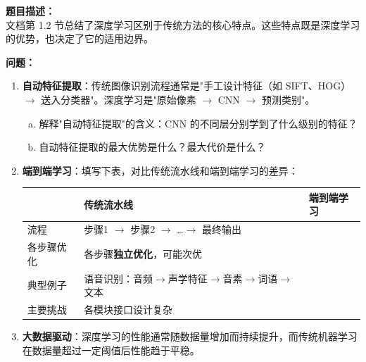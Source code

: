 \documentclass[a4paper,11pt]{ctexart}
\begin{document}
\begin{problembox}
    \textbf{题目描述：}\\
    文档第 1.2 节总结了深度学习区别于传统方法的核心特点。这些特点既是深度学习的优势，也决定了它的适用边界。

    \vspace{0.3cm}
    \textbf{问题：}
    \begin{enumerate}[(1)]
        \item \textbf{自动特征提取}：传统图像识别流程通常是"手工设计特征（如 SIFT、HOG）$\to$ 送入分类器"。深度学习是"原始像素 $\to$ CNN $\to$ 预测类别"。

        \begin{enumerate}[a.]
            \item 解释"自动特征提取"的含义：CNN 的不同层分别学到了什么级别的特征？
            \item 自动特征提取的最大优势是什么？最大代价是什么？
        \end{enumerate}

        \item \textbf{端到端学习}：填写下表，对比传统流水线和端到端学习的差异：

        \begin{center}
        \begin{tabular}{p{3.0cm} p{4.5cm} p{4.0cm}}
            \toprule
            & 传统流水线 & 端到端学习 \\
            \midrule
            流程 & 步骤1 $\to$ 步骤2 $\to$ \ldots $\to$ 最终输出 & \underline{\hspace{3.5cm}} \\[1.5em]
            各步骤优化 & 各步骤\textbf{独立优化}，可能次优 & \underline{\hspace{3.5cm}} \\[1.5em]
            典型例子 & 语音识别：音频$\to$声学特征$\to$音素$\to$词语$\to$文本 & \underline{\hspace{3.5cm}} \\[1.5em]
            主要挑战 & 各模块接口设计复杂 & \underline{\hspace{3.5cm}} \\
            \bottomrule
        \end{tabular}
        \end{center}

        \item \textbf{大数据驱动}：深度学习的性能通常随数据量增加而持续提升，而传统机器学习在数据量超过一定阈值后性能趋于平稳。


\end{enumerate}
\end{problembox}
\end{document}
